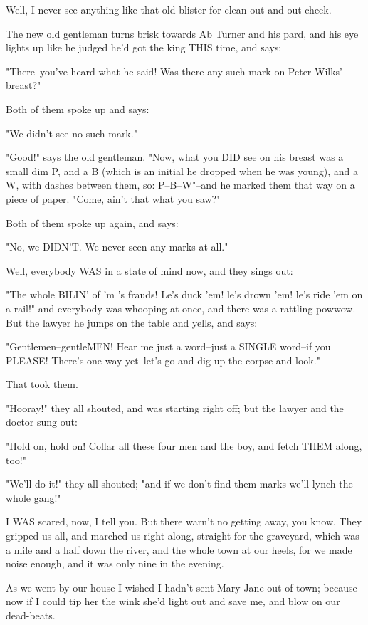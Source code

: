 Well, I never see anything like that old blister for clean out-and-out
cheek.

The new old gentleman turns brisk towards Ab Turner and his pard, and his
eye lights up like he judged he'd got the king THIS time, and says:

"There--you've heard what he said!  Was there any such mark on Peter
Wilks' breast?"

Both of them spoke up and says:

"We didn't see no such mark."

"Good!" says the old gentleman.  "Now, what you DID see on his breast was
a small dim P, and a B (which is an initial he dropped when he was
young), and a W, with dashes between them, so:  P--B--W"--and he marked
them that way on a piece of paper.  "Come, ain't that what you saw?"

Both of them spoke up again, and says:

"No, we DIDN'T.  We never seen any marks at all."

Well, everybody WAS in a state of mind now, and they sings out:

"The whole BILIN' of 'm 's frauds!  Le's duck 'em! le's drown 'em! le's
ride 'em on a rail!" and everybody was whooping at once, and there was a
rattling powwow.  But the lawyer he jumps on the table and yells, and
says:

"Gentlemen--gentleMEN!  Hear me just a word--just a SINGLE word--if you
PLEASE!  There's one way yet--let's go and dig up the corpse and look."

That took them.

"Hooray!" they all shouted, and was starting right off; but the lawyer
and the doctor sung out:

"Hold on, hold on!  Collar all these four men and the boy, and fetch THEM
along, too!"

"We'll do it!" they all shouted; "and if we don't find them marks we'll
lynch the whole gang!"

I WAS scared, now, I tell you.  But there warn't no getting away, you
know. They gripped us all, and marched us right along, straight for the
graveyard, which was a mile and a half down the river, and the whole town
at our heels, for we made noise enough, and it was only nine in the
evening.

As we went by our house I wished I hadn't sent Mary Jane out of town;
because now if I could tip her the wink she'd light out and save me, and
blow on our dead-beats.

